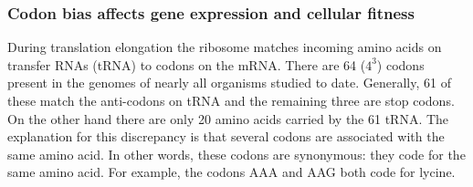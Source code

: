

\subsubsection{Codon bias affects gene expression and cellular fitness}
During translation elongation the ribosome matches incoming amino acids on
transfer RNAs (tRNA) to codons on the mRNA. There are 64 ($4^3$) codons present
in the genomes of nearly all organisms studied to date. Generally, 61 of these
match the anti-codons on tRNA and the remaining three are stop codons. On the
other hand there are only 20 amino acids carried by the 61 tRNA. The
explanation for this discrepancy is that several codons are associated with the
same amino acid. In other words, these codons are synonymous: they code for the
same amino acid. For example, the codons AAA and AAG both code for lycine.

